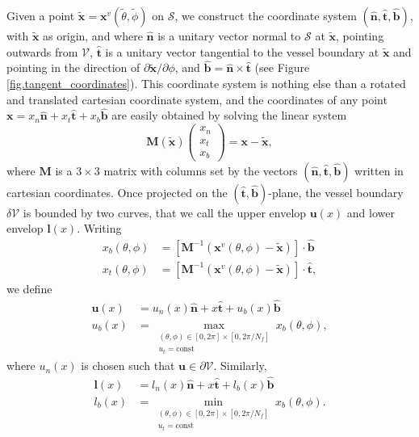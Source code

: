 \documentclass[12pt]{article}
\begin{document}
Given a point $\mathbf{\tilde x}=\mathbf{x}^v(\tilde{\theta},\tilde{\phi})$ on $\mathcal{S}$, we construct the coordinate system $(\hat{\mathbf{n}},\hat{\mathbf{t}},\hat{\textbf{b}})$, with $\mathbf{\tilde x}$ as origin, and where $\hat{\mathbf{n}}$ is a unitary vector normal to $\mathcal{S}$ at $\mathbf{\tilde x}$, pointing outwards from $\mathcal{V}$, $\hat{\mathbf{t}}$ is a unitary vector tangential to the vessel boundary at $\mathbf{\tilde x}$ and pointing in the direction of $\partial \mathbf{\tilde x}/\partial \phi$, and $\hat{\mathbf{b}}=\hat{\mathbf{n}}\times\hat{\mathbf{t}}$ (see Figure \ref{fig.tangent_coordinates}). This coordinate system is nothing else than a rotated and translated cartesian coordinate system, and the coordinates of any point $\mathbf{x}=x_n\hat{\mathbf{n}}+x_t\hat{\mathbf{t}}+x_b\hat{\textbf{b}}$ are easily obtained by solving the linear system
\begin{equation}
\mathbf{M}(\tilde{\mathbf{x}})\left(\begin{matrix}
    x_n\\
    x_t\\
    x_b
\end{matrix}\right) = \mathbf{x}-\mathbf{\tilde x},\label{eq.projection}
\end{equation}
where $\mathbf{M}$ is a $3\times 3$ matrix with columns set by the vectors $(\hat{\mathbf{n}},\hat{\mathbf{t}},\hat{\textbf{b}})$ written in cartesian coordinates. Once projected on the $(\hat{\mathbf{t}},\hat{\mathbf{b}})$-plane, the vessel boundary $\delta\mathcal{V}$ is bounded by two curves, that we call the upper envelop $\mathbf{u}(x)$ and lower envelop $\mathbf{l}(x)$. Writing 
\begin{align}
    x_b(\theta,\phi) &= \left[\mathbf{M}^{-1}(\mathbf{x}^v(\theta,\phi)-\tilde{\mathbf{x}})\right]\cdot \hat{\mathbf{b}}\\
    x_t(\theta,\phi) &= \left[\mathbf{M}^{-1}(\mathbf{x}^v(\theta,\phi)-\tilde{\mathbf{x}})\right]\cdot \hat{\mathbf{t}},
\end{align}
we define
\begin{align}
    \mathbf{u}(x) &= u_n(x)\hat{\mathbf{n}} + x\hat{\mathbf{t}} + u_b(x)\hat{\mathbf{b}}\label{eq.u-def}\\
    u_b(x) &= \max_{\substack{(\theta,\phi) \in [0,2\pi]\times[0,2\pi/N_f]\\ u_t=\text{const}}} x_b(\theta,\phi),
\end{align}
where $u_n(x)$ is chosen such that $\mathbf{u}\in\partial\mathcal{V}$. Similarly,
\begin{align}
    \mathbf{l}(x) &= l_n(x)\hat{\mathbf{n}} + x\hat{\mathbf{t}} + l_b(x)\hat{\mathbf{b}}\\
    l_b(x) &= \min_{\substack{(\theta,\phi) \in [0,2\pi]\times[0,2\pi/N_f]\\ u_t=\text{const}}} x_b(\theta,\phi).\label{eq.l-def}
\end{align}
\end{document}
